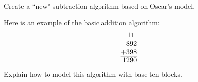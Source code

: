 \
\begin{prob} Create a ``new'' subtraction algorithm based on Oscar's model.
\end{prob}


\begin{prob}
Here is an example of the basic addition algorithm:
\[
\begin{tabular}{@{}r@{}}
11~~\\
892\\
+398\\ \hline
1290
\end{tabular}
\]
Explain how to model this algorithm with base-ten blocks.
\end{prob}





